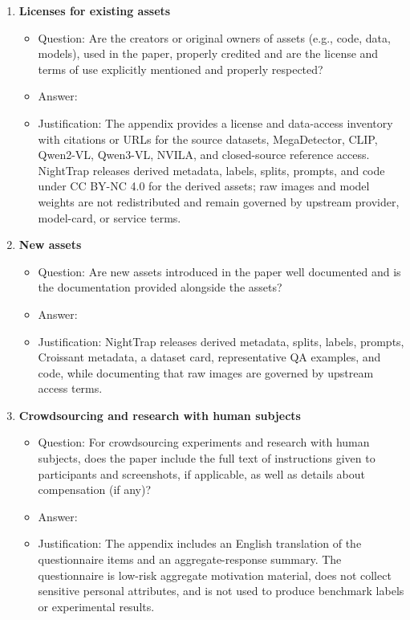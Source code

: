 \begin{enumerate}
\item {\bf Licenses for existing assets}
\begin{itemize}
    \item[] Question: Are the creators or original owners of assets (e.g., code, data, models), used in the paper, properly credited and are the license and terms of use explicitly mentioned and properly respected?
    \item[] Answer: \answerYes{}
    \item[] Justification: The appendix provides a license and data-access inventory with citations or URLs for the source datasets, MegaDetector, CLIP, Qwen2-VL, Qwen3-VL, NVILA, and closed-source reference access. NightTrap releases derived metadata, labels, splits, prompts, and code under CC BY-NC 4.0 for the derived assets; raw images and model weights are not redistributed and remain governed by upstream provider, model-card, or service terms.
\end{itemize}

\item {\bf New assets}
\begin{itemize}
    \item[] Question: Are new assets introduced in the paper well documented and is the documentation provided alongside the assets?
    \item[] Answer: \answerYes{}
    \item[] Justification: NightTrap releases derived metadata, splits, labels, prompts, Croissant metadata, a dataset card, representative QA examples, and code, while documenting that raw images are governed by upstream access terms.
\end{itemize}

\item {\bf Crowdsourcing and research with human subjects}
\begin{itemize}
    \item[] Question: For crowdsourcing experiments and research with human subjects, does the paper include the full text of instructions given to participants and screenshots, if applicable, as well as details about compensation (if any)?
    \item[] Answer: \answerYes{}
    \item[] Justification: The appendix includes an English translation of the questionnaire items and an aggregate-response summary. The questionnaire is low-risk aggregate motivation material, does not collect sensitive personal attributes, and is not used to produce benchmark labels or experimental results.
\end{itemize}


\end{enumerate}
